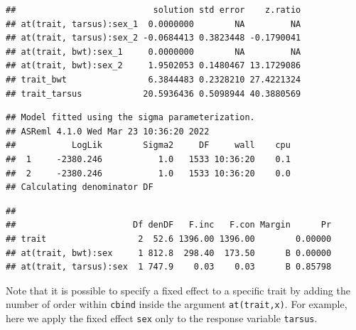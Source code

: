 \documentclass[
  12pt,
]{book}
\begin{document}
\begin{verbatim}
##                           solution std error    z.ratio
## at(trait, tarsus):sex_1  0.0000000        NA         NA
## at(trait, tarsus):sex_2 -0.0684413 0.3823448 -0.1790041
## at(trait, bwt):sex_1     0.0000000        NA         NA
## at(trait, bwt):sex_2     1.9502053 0.1480467 13.1729086
## trait_bwt                6.3844483 0.2328210 27.4221324
## trait_tarsus            20.5936436 0.5098944 40.3880569
\end{verbatim}

\begin{verbatim}
## Model fitted using the sigma parameterization.
## ASReml 4.1.0 Wed Mar 23 10:36:20 2022
##           LogLik        Sigma2     DF     wall    cpu
##  1     -2380.246           1.0   1533 10:36:20    0.1
##  2     -2380.246           1.0   1533 10:36:20    0.0
## Calculating denominator DF
\end{verbatim}

\begin{verbatim}
## 
##                       Df denDF   F.inc   F.con Margin      Pr
## trait                  2  52.6 1396.00 1396.00        0.00000
## at(trait, bwt):sex     1 812.8  298.40  173.50      B 0.00000
## at(trait, tarsus):sex  1 747.9    0.03    0.03      B 0.85798
\end{verbatim}

Note that it is possible to specify a fixed effect to a specific trait by adding the number of order within \texttt{cbind} inside the argument \texttt{at(trait,x)}. For example, here we apply the fixed effect \texttt{sex} only to the response variable \texttt{tarsus}.
\end{document}
